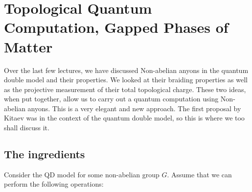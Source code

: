 \section{Topological Quantum Computation, Gapped Phases of Matter}
Over the last few lectures, we have discussed Non-abelian anyons in the quantum double model and their properties. We looked at their braiding properties as well as the projective measurement of their total topological charge. These two ideas, when put together, allow us to carry out a quantum computation using Non-abelian anyons. This is a very elegant and new approach. The first proposal by Kitaev was in the context of the quantum double model, so this is where we too shall discuss it.

\subsection{The ingredients}
Consider the QD model for some non-abelian group $G$. Assume that we can perform the following operations:
